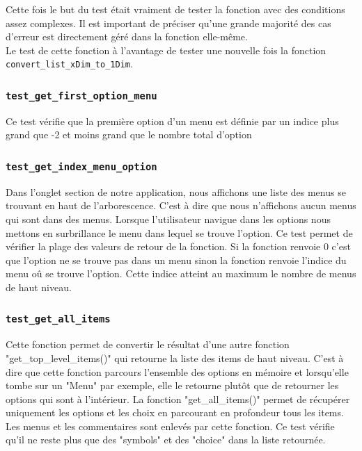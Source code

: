 \documentclass[16pts]{report}
\begin{document}
Cette fois le but du test était vraiment de tester la fonction avec des
conditions assez complexes. Il est important de préciser qu'une grande majorité
des cas d'erreur est directement géré dans la fonction elle-même.\\

Le test de cette fonction à l'avantage de tester une nouvelle fois la fonction
\verb|convert_list_xDim_to_1Dim|.

\subsubsection{\texttt{test\_get\_first\_option\_menu}}

Ce test vérifie que la première option d'un menu est définie par un indice
plus grand que -2 et moins grand que le nombre total d'option

\subsubsection{\texttt{test\_get\_index\_menu\_option}}

Dans l'onglet section de notre application, nous affichons une liste des menus
se trouvant en haut de l'arborescence. C'est à dire que nous n'affichons aucun
menus qui sont dans des menus. Lorsque l'utilisateur navigue dans les options
nous mettons en surbrillance le menu dans lequel se trouve l'option.  Ce test
permet de vérifier la plage des valeurs de retour de la fonction.  Si la
fonction renvoie 0 c'est que l'option ne se trouve pas dans un menu sinon la
fonction renvoie l'indice du menu oû se trouve l'option. Cette indice atteint
au maximum le nombre de menus de haut niveau.

\subsubsection{\texttt{test\_get\_all\_items}}

Cette fonction permet de convertir le résultat d'une autre fonction
"get\_top\_level\_items()" qui retourne la liste des items de haut niveau.
C'est à dire que cette fonction parcours l'ensemble des options en mémoire et
lorsqu'elle tombe sur un "Menu" par exemple, elle le retourne plutôt que de
retourner les options qui sont à l'intérieur. La fonction "get\_all\_items()"
permet de récupérer uniquement les options et les choix en parcourant en
profondeur tous les items. Les menus et les commentaires sont enlevés par cette
fonction. Ce test vérifie qu'il ne reste plus que des "symbols" et des "choice"
dans la liste retournée.
\end{document}
